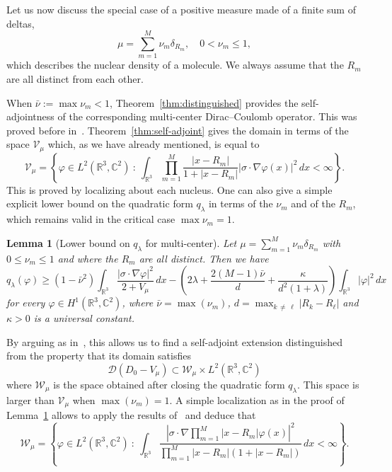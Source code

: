\documentclass[10pt]{amsart}
\newtheorem{lemm}[cdrthm]{Lemma}
\theoremstyle{definition}
\newcommand{\R}{\mathbb{R}}
\newcommand{\C}{\mathbb{C}}
\newcommand{\cV}{\mathcal{V}}
\newcommand{\cD}{\mathcal{D}}
\newcommand{\cW}{\mathcal{W}}
\newcommand\1{{\ensuremath {\mathds 1} }}
\renewcommand\phi{\varphi}
\newcommand{\ii}{\infty}
\renewcommand{\geq}{\geqslant}
\renewcommand{\leq}{\leqslant}
\begin{document}
Let us now discuss the special case of a positive measure made of a finite sum of deltas,
\[
\mu=\sum_{m=1}^M\nu_m\delta_{R_m},\quad 0<\nu_m\leq1,
\]
which describes the nuclear density of a molecule. We always assume that the $R_m$ are all distinct from each other.

When $\bar\nu:=\max\nu_m<1$, Theorem~\ref{thm:distinguished} provides the self-adjointness of the corresponding multi-center Dirac--Coulomb operator. This was proved before in~\cite{Klaus-80b,Nenciu-77}. Theorem~\ref{thm:self-adjoint} gives the domain in terms of the space $\cV_\mu$ which, as we have already mentioned, is equal to
\[
\cV_\mu=\left\{\phi \in L^2\left(\R^3,\C^2\right)\ :\ \int_{\R^3}\prod_{m=1}^M\frac{|x-R_m|}{1+|x-R_m|}\left|\sigma\cdot\nabla \phi(x)\right|^2\,dx<\ii\right\}.
\]
This is proved by localizing about each nucleus. One can also give a simple explicit lower bound on the quadratic form $q_\lambda$ in terms of the $\nu_m$ and of the $R_m$, which remains valid in the critical case $\max\nu_m=1$.

\begin{lemm}[Lower bound on $q_\lambda$ for multi-center]\label{lem:estim_q_lambda}
Let $\mu=\sum_{m=1}^M\nu_m\delta_{R_m}$ with $0\leq \nu_m\leq 1$ and where the $R_m$ are all distinct. Then we have
\begin{equation*}
q_\lambda(\phi)\geq \left(1-\bar\nu^2\right)\int_{\R^3}\frac{\left|\sigma\cdot \nabla \phi\right|^2}{2+V_\mu}\,dx -\left(2\lambda+\frac{2(M-1)\bar\nu}{d}+\frac{\kappa}{d^2(1+\lambda)}\right)\int_{\R^3}|\phi|^2\,dx
\end{equation*}
for every $\phi\in H^1(\R^3,\C^2)$, where $\bar\nu=\max(\nu_m)$, $d=\max_{k\,\neq\,\ell}|R_k-R_\ell|$ and $\kappa>0$ is a universal constant.
\end{lemm}

By arguing as in~\cite{EstLos-07,EstLos-08,EstLewSer-19}, this allows us to find a self-adjoint extension distinguished from the property that its domain satisfies
\[
\cD\left(D_0-V_\mu\right)\subset \cW_\mu\times L^2\left(\R^3,\C^2\right)
\]
where $\cW_\mu$ is the space obtained after closing the quadratic form $q_\lambda$. This space is larger than $\cV_\mu$ when $\max(\nu_m)=1$. A simple localization as in the proof of Lemma~\ref{lem:estim_q_lambda} allows to apply the results of~\cite{EstLewSer-19} and deduce that
\begin{equation}
\cW_\mu=\left\{\phi \in L^2\left(\R^3,\C^2\right)\ :\ \int_{\R^3}\frac{\left|\sigma\cdot\nabla\prod_{m=1}^M \left|x-R_m\right| \phi(x)\right|^2}{\prod_{m=1}^M\left|x-R_m\right|\left(1+\left|x-R_m\right|\right)}\,dx<\ii\right\}.
\end{equation}
\end{document}
